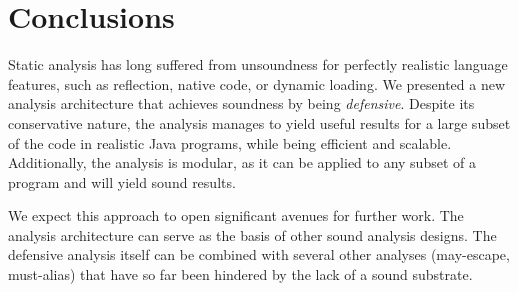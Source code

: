 






\section{Conclusions}

Static analysis has long suffered from unsoundness for perfectly
realistic language features, such as reflection, native code, or
dynamic loading. We presented a new analysis architecture that
achieves soundness by being \emph{defensive}. Despite its conservative
nature, the analysis manages to yield useful results for a large
subset of the code in realistic Java programs, while being efficient
and scalable. Additionally, the analysis is modular, as it can be
applied to any subset of a program and will yield sound results.

We expect this approach to open significant avenues for further
work. The analysis architecture can serve as the basis of other sound
analysis designs. The defensive analysis itself can be combined with
several other analyses (may-escape, must-alias) that have so far been
hindered by the lack of a sound substrate.



